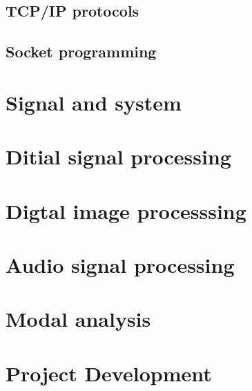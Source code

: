 \documentclass[UTF8]{ctexbook}
\begin{document}
	\chapter{TCP/IP protocols}
	\chapter{Socket programming}
	
	
	\part{Signal and system}
	
	\part{Ditial signal processing}
	\begin{comment} 
	rather stupid, but helpful 
	\chapter{FFT}
	\chapter{FIR}
	\chapter{IIR}
	\end{comment}

	
	\part{Digtal image processsing}
	
	\part{Audio signal processing}
	
	\part{Modal analysis}	
	
	\part{Project Development}
	
	\begin{comment} 
	rather stupid, but helpful 
	\chapter{8-channel data acquistion system design}
	\chapter{32-channel data acquistion system design}
	\chapter{64-channel data acquistion system design}
	\end{comment}
\end{document}
